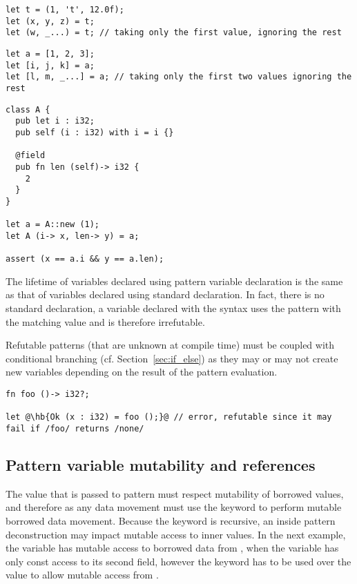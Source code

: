 \begin{lstlisting}[style=coloredverbatim, escapechar=@, caption=Tuple deconstruction]
let t = (1, 't', 12.0f);
let (x, y, z) = t;
let (w, _...) = t; // taking only the first value, ignoring the rest
\end{lstlisting}

\begin{lstlisting}[style=coloredverbatim, escapechar=@, caption=Array deconstruction]
let a = [1, 2, 3];
let [i, j, k] = a;
let [l, m, _...] = a; // taking only the first two values ignoring the rest
\end{lstlisting}

\begin{lstlisting}[style=coloredverbatim, caption=Class field access]
class A {
  pub let i : i32;
  pub self (i : i32) with i = i {}

  @field
  pub fn len (self)-> i32 {
    2
  }
}

let a = A::new (1);
let A (i-> x, len-> y) = a;

assert (x == a.i && y == a.len);
\end{lstlisting}

The lifetime of variables declared using pattern variable declaration is the
same as that of variables declared using standard declaration. In fact, there is
no standard declaration, a variable declared with the syntax  uses the pattern  with the matching value 
and is therefore irrefutable.

Refutable patterns (that are unknown at compile time) must be coupled with
conditional branching (cf. Section~\ref{sec:if_else}) as they may or may not
create new variables depending on the result of the pattern evaluation.

\begin{lstlisting}[style=coloredverbatim, escapechar=@]
fn foo ()-> i32?;

let @\hb{Ok (x : i32) = foo ();}@ // error, refutable since it may fail if /foo/ returns /none/
\end{lstlisting}

\subsection{Pattern variable mutability and references}

The value that is passed to pattern must respect mutability of borrowed values,
and therefore as any data movement must use the keyword  to
perform mutable borrowed data movement. Because the keyword is recursive, an
inside pattern deconstruction may impact mutable access to inner values. In the
next example, the variable  has mutable access to borrowed data from
, when the variable  has only const access to its second
field, however the keyword  has to be used over the value
 to allow mutable access from .

